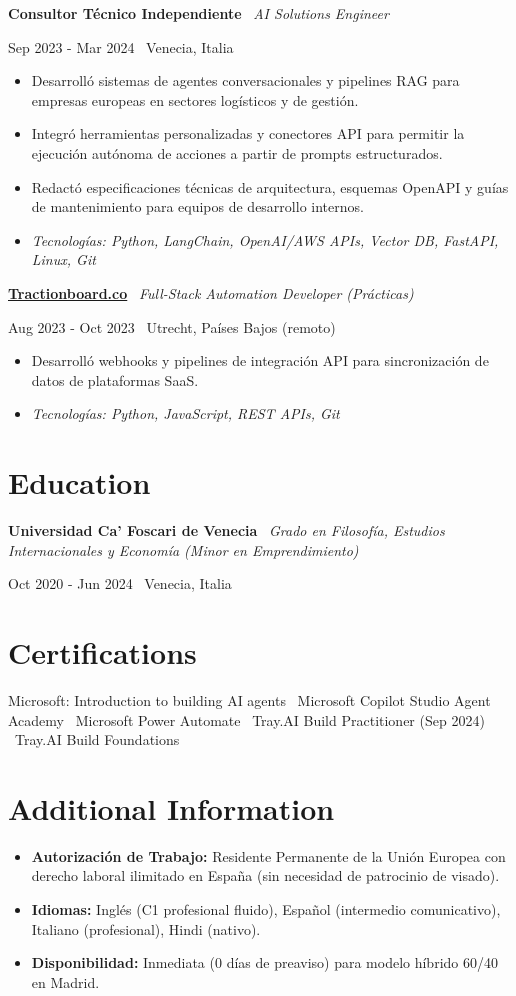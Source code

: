 \documentclass[a4paper,10pt]{article}
\newcommand{\role}[4]{%
  \vspace{2pt}\noindent
  \begin{minipage}[t]{0.70\textwidth}\raggedright\textbf{#1} \textbullet\ \textit{#3}\end{minipage}%
  \hfill
  \begin{minipage}[t]{0.28\textwidth}\raggedleft\footnotesize\color{gray}#2 \textbullet\ #4\end{minipage}%
  \vspace{1pt}%
}
\begin{document}
\role{Consultor Técnico Independiente}{Sep 2023 - Mar 2024}{AI Solutions Engineer}{Venecia, Italia}
\begin{itemize}
  \item Desarrolló sistemas de agentes conversacionales y pipelines RAG para empresas europeas en sectores logísticos y de gestión.
  \item Integró herramientas personalizadas y conectores API para permitir la ejecución autónoma de acciones a partir de prompts estructurados.
  \item Redactó especificaciones técnicas de arquitectura, esquemas OpenAPI y guías de mantenimiento para equipos de desarrollo internos.
  \item \textit{Tecnologías: Python, LangChain, OpenAI/AWS APIs, Vector DB, FastAPI, Linux, Git}
\end{itemize}

\role{\href{https://tractionboard.co}{Tractionboard.co}}{Aug 2023 - Oct 2023}{Full-Stack Automation Developer (Prácticas)}{Utrecht, Países Bajos (remoto)}
\begin{itemize}
  \item Desarrolló webhooks y pipelines de integración API para sincronización de datos de plataformas SaaS.
  \item \textit{Tecnologías: Python, JavaScript, REST APIs, Git}
\end{itemize}

\section{Education}
\role{Universidad Ca' Foscari de Venecia}{Oct 2020 - Jun 2024}{Grado en Filosofía, Estudios Internacionales y Economía (Minor en Emprendimiento)}{Venecia, Italia}

\section{Certifications}
Microsoft: Introduction to building AI agents \textbullet\ Microsoft Copilot Studio Agent Academy \textbullet\ Microsoft Power Automate \textbullet\ Tray.AI Build Practitioner (Sep 2024) \textbullet\ Tray.AI Build Foundations

\section{Additional Information}
\begin{itemize}
  \item \textbf{Autorización de Trabajo:} Residente Permanente de la Unión Europea con derecho laboral ilimitado en España (sin necesidad de patrocinio de visado).
  \item \textbf{Idiomas:} Inglés (C1 profesional fluido), Español (intermedio comunicativo), Italiano (profesional), Hindi (nativo).
  \item \textbf{Disponibilidad:} Inmediata (0 días de preaviso) para modelo híbrido 60/40 en Madrid.
\end{itemize}
\end{document}

